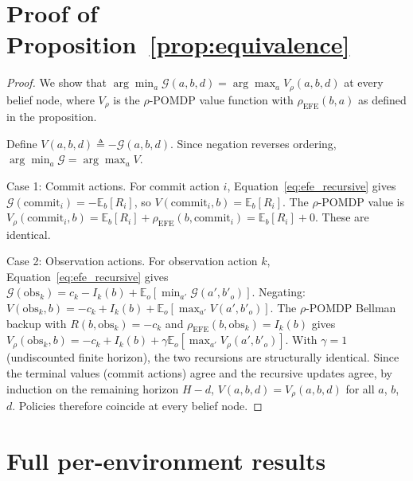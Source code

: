 \documentclass[runningheads]{llncs}
\begin{document}
\appendix

\section{Proof of Proposition~\ref{prop:equivalence}}
\label{app:proof}

\begin{proof}
We show that $\arg\min_a \mathcal{G}(a, b, d) = \arg\max_a V_\rho(a, b, d)$ at every belief node, where $V_\rho$ is the $\rho$-POMDP value function with $\rho_{\mathrm{EFE}}(b, a)$ as defined in the proposition.

Define $V(a, b, d) \triangleq -\mathcal{G}(a, b, d)$. Since negation reverses ordering, $\arg\min_a \mathcal{G} = \arg\max_a V$.

Case 1: Commit actions. For commit action $i$, Equation~\ref{eq:efe_recursive} gives $\mathcal{G}(\text{commit}_i) = -\mathbb{E}_b[R_i]$, so $V(\text{commit}_i, b) = \mathbb{E}_b[R_i]$. The $\rho$-POMDP value is $V_\rho(\text{commit}_i, b) = \mathbb{E}_b[R_i] + \rho_{\mathrm{EFE}}(b, \text{commit}_i) = \mathbb{E}_b[R_i] + 0$. These are identical.

Case 2: Observation actions. For observation action $k$, Equation~\ref{eq:efe_recursive} gives
$\mathcal{G}(\text{obs}_k) = c_k - I_k(b) + \mathbb{E}_o[\min_{a'} \mathcal{G}(a', b'_o)].$
Negating:
$V(\text{obs}_k, b) = -c_k + I_k(b) + \mathbb{E}_o[\max_{a'} V(a', b'_o)].$
The $\rho$-POMDP Bellman backup with $R(b, \text{obs}_k) = -c_k$ and $\rho_{\mathrm{EFE}}(b, \text{obs}_k) = I_k(b)$ gives
$V_\rho(\text{obs}_k, b) = -c_k + I_k(b) + \gamma \mathbb{E}_o[\max_{a'} V_\rho(a', b'_o)].$
With $\gamma = 1$ (undiscounted finite horizon), the two recursions are structurally identical. Since the terminal values (commit actions) agree and the recursive updates agree, by induction on the remaining horizon $H - d$, $V(a, b, d) = V_\rho(a, b, d)$ for all $a$, $b$, $d$. Policies therefore coincide at every belief node.
\end{proof}

\section{Full per-environment results}
\label{app:full_tables}
\end{document}
